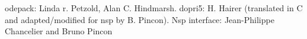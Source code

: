 \begin{manseealso}
\end{manseealso}

\begin{authors}
 odepack: Linda r. Petzold, Alan C. Hindmarsh. dopri5: H. Hairer (translated in C and adapted/modified
for nsp by B. Pincon).  Nsp interface: Jean-Philippe Chancelier and Bruno Pincon
\end{authors}
